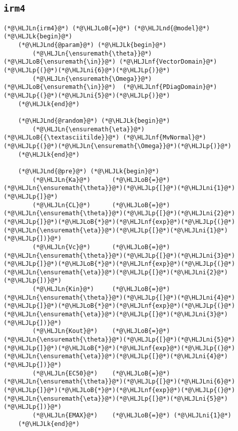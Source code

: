 \documentclass[12pt,a4paper]{article}
\newcommand{\HLJLk}[1]{\textcolor[RGB]{148,91,176}{\textbf{#1}}}
\newcommand{\HLJLn}[1]{#1}
\newcommand{\HLJLnd}[1]{\textcolor[RGB]{214,102,97}{#1}}
\newcommand{\HLJLnf}[1]{\textcolor[RGB]{66,102,213}{#1}}
\newcommand{\HLJLni}[1]{\textcolor[RGB]{59,151,46}{#1}}
\newcommand{\HLJLoB}[1]{\textcolor[RGB]{102,102,102}{\textbf{#1}}}
\newcommand{\HLJLp}[1]{#1}
\begin{document}
\subsection{\texttt{irm4}}

\begin{lstlisting}
(*@\HLJLn{irm4}@*) (*@\HLJLoB{=}@*) (*@\HLJLnd{@model}@*) (*@\HLJLk{begin}@*)
    (*@\HLJLnd{@param}@*) (*@\HLJLk{begin}@*)
        (*@\HLJLn{\ensuremath{\theta}}@*) (*@\HLJLoB{\ensuremath{\in}}@*) (*@\HLJLnf{VectorDomain}@*)(*@\HLJLp{(}@*)(*@\HLJLni{6}@*)(*@\HLJLp{)}@*)
        (*@\HLJLn{\ensuremath{\Omega}}@*) (*@\HLJLoB{\ensuremath{\in}}@*)  (*@\HLJLnf{PDiagDomain}@*)(*@\HLJLp{(}@*)(*@\HLJLni{5}@*)(*@\HLJLp{)}@*)
    (*@\HLJLk{end}@*)

    (*@\HLJLnd{@random}@*) (*@\HLJLk{begin}@*)
        (*@\HLJLn{\ensuremath{\eta}}@*) (*@\HLJLoB{{\textasciitilde}}@*) (*@\HLJLnf{MvNormal}@*)(*@\HLJLp{(}@*)(*@\HLJLn{\ensuremath{\Omega}}@*)(*@\HLJLp{)}@*)
    (*@\HLJLk{end}@*)

    (*@\HLJLnd{@pre}@*) (*@\HLJLk{begin}@*)
        (*@\HLJLn{Ka}@*)      (*@\HLJLoB{=}@*) (*@\HLJLn{\ensuremath{\theta}}@*)(*@\HLJLp{[}@*)(*@\HLJLni{1}@*)(*@\HLJLp{]}@*)
        (*@\HLJLn{CL}@*)      (*@\HLJLoB{=}@*) (*@\HLJLn{\ensuremath{\theta}}@*)(*@\HLJLp{[}@*)(*@\HLJLni{2}@*)(*@\HLJLp{]}@*)(*@\HLJLoB{*}@*)(*@\HLJLnf{exp}@*)(*@\HLJLp{(}@*)(*@\HLJLn{\ensuremath{\eta}}@*)(*@\HLJLp{[}@*)(*@\HLJLni{1}@*)(*@\HLJLp{])}@*)
        (*@\HLJLn{Vc}@*)      (*@\HLJLoB{=}@*) (*@\HLJLn{\ensuremath{\theta}}@*)(*@\HLJLp{[}@*)(*@\HLJLni{3}@*)(*@\HLJLp{]}@*)(*@\HLJLoB{*}@*)(*@\HLJLnf{exp}@*)(*@\HLJLp{(}@*)(*@\HLJLn{\ensuremath{\eta}}@*)(*@\HLJLp{[}@*)(*@\HLJLni{2}@*)(*@\HLJLp{])}@*)
        (*@\HLJLn{Kin}@*)     (*@\HLJLoB{=}@*) (*@\HLJLn{\ensuremath{\theta}}@*)(*@\HLJLp{[}@*)(*@\HLJLni{4}@*)(*@\HLJLp{]}@*)(*@\HLJLoB{*}@*)(*@\HLJLnf{exp}@*)(*@\HLJLp{(}@*)(*@\HLJLn{\ensuremath{\eta}}@*)(*@\HLJLp{[}@*)(*@\HLJLni{3}@*)(*@\HLJLp{])}@*)
        (*@\HLJLn{Kout}@*)    (*@\HLJLoB{=}@*) (*@\HLJLn{\ensuremath{\theta}}@*)(*@\HLJLp{[}@*)(*@\HLJLni{5}@*)(*@\HLJLp{]}@*)(*@\HLJLoB{*}@*)(*@\HLJLnf{exp}@*)(*@\HLJLp{(}@*)(*@\HLJLn{\ensuremath{\eta}}@*)(*@\HLJLp{[}@*)(*@\HLJLni{4}@*)(*@\HLJLp{])}@*)
        (*@\HLJLn{EC50}@*)    (*@\HLJLoB{=}@*) (*@\HLJLn{\ensuremath{\theta}}@*)(*@\HLJLp{[}@*)(*@\HLJLni{6}@*)(*@\HLJLp{]}@*)(*@\HLJLoB{*}@*)(*@\HLJLnf{exp}@*)(*@\HLJLp{(}@*)(*@\HLJLn{\ensuremath{\eta}}@*)(*@\HLJLp{[}@*)(*@\HLJLni{5}@*)(*@\HLJLp{])}@*)
        (*@\HLJLn{EMAX}@*)    (*@\HLJLoB{=}@*) (*@\HLJLni{1}@*)
    (*@\HLJLk{end}@*)


\end{lstlisting}
\end{document}
